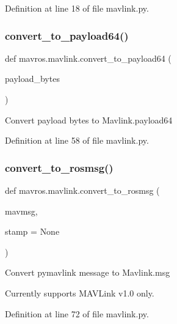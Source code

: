 Definition at line 18 of file mavlink.\+py.

\mbox{\label{namespacemavros_1_1mavlink_a1be406085dd2e7230daf05c7e2877ae0}} 
\subsubsection{\texorpdfstring{convert\_to\_payload64()}{convert\_to\_payload64()}}
{\footnotesize\ttfamily def mavros.\+mavlink.\+convert\+\_\+to\+\_\+payload64 (\begin{DoxyParamCaption}\item[{}]{payload\+\_\+bytes }\end{DoxyParamCaption})}

\begin{DoxyVerb}Convert payload bytes to Mavlink.payload64
\end{DoxyVerb}
 

Definition at line 58 of file mavlink.\+py.

\mbox{\label{namespacemavros_1_1mavlink_a2ab39b2014ffed0a13abff04b4170fc3}} 
\subsubsection{\texorpdfstring{convert\_to\_rosmsg()}{convert\_to\_rosmsg()}}
{\footnotesize\ttfamily def mavros.\+mavlink.\+convert\+\_\+to\+\_\+rosmsg (\begin{DoxyParamCaption}\item[{}]{mavmsg,  }\item[{}]{stamp = {\ttfamily None} }\end{DoxyParamCaption})}

\begin{DoxyVerb}Convert pymavlink message to Mavlink.msg

Currently supports MAVLink v1.0 only.
\end{DoxyVerb}
 

Definition at line 72 of file mavlink.\+py.

